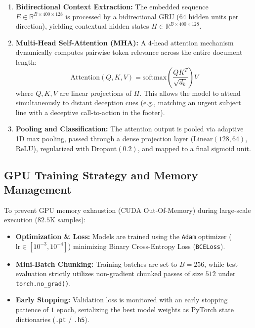 \documentclass[conference]{IEEEtran}
\begin{document}
\begin{enumerate}
    \item \textbf{Bidirectional Context Extraction:} The embedded sequence $E \in \mathbb{R}^{B \times 400 \times 128}$ is processed by a bidirectional GRU ($64$ hidden units per direction), yielding contextual hidden states $H \in \mathbb{R}^{B \times 400 \times 128}$.

    \item \textbf{Multi-Head Self-Attention (MHA):} A $4$-head attention mechanism dynamically computes pairwise token relevance across the entire document length:
    \begin{equation}
    \text{Attention}(Q, K, V) = \text{softmax}\left(\frac{Q K^T}{\sqrt{d_k}}\right) V
    \end{equation}
    where $Q, K, V$ are linear projections of $H$. This allows the model to attend simultaneously to distant deception cues (e.g., matching an urgent subject line with a deceptive call-to-action in the footer).

    \item \textbf{Pooling and Classification:} The attention output is pooled via adaptive 1D max pooling, passed through a dense projection layer ($\text{Linear}(128, 64)$, $\text{ReLU}$), regularized with $\text{Dropout}(0.2)$, and mapped to a final sigmoid unit.
\end{enumerate}

\subsection{GPU Training Strategy and Memory Management}
To prevent GPU memory exhaustion (CUDA Out-Of-Memory) during large-scale execution ($82.5\text{K}$ samples):
\begin{itemize}
    \item \textbf{Optimization \& Loss:} Models are trained using the \texttt{Adam} optimizer ($\text{lr} \in [10^{-3}, 10^{-4}]$) minimizing Binary Cross-Entropy Loss (\texttt{BCELoss}).
    \item \textbf{Mini-Batch Chunking:} Training batches are set to $B = 256$, while test evaluation strictly utilizes non-gradient chunked passes of size $512$ under \texttt{torch.no\_grad()}.
    \item \textbf{Early Stopping:} Validation loss is monitored with an early stopping patience of $1$ epoch, serializing the best model weights as PyTorch state dictionaries (\texttt{.pt} / \texttt{.h5}).
\end{itemize}
\end{document}
